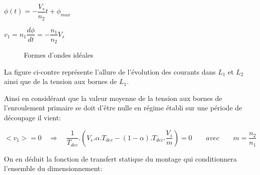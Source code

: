 \documentclass[12pt]{article}
\begin{document}
\vspace{20pt}
$\phi (t) = -\dfrac{V_s}{n_2}t + \phi_{max}$\par
\vspace{10pt}
$v_1 = n_1 \dfrac{d\phi}{dt} = -\dfrac{n_1}{n_2} V_s$ \par



\begin{figure}
  \vspace{-90pt}
  \hspace{-0pt}
  \begin{center}
  \end{center}
  \vspace{-5pt}
  \caption{Formes d'ondes idéales}
  \vspace{-10pt}
\end{figure}
\vspace{120pt}  
La figure ci-contre représente l'allure de l'évolution des courants dans $L_1$ et $L_2$ ainsi que de la tension aux bornes de $L_1$.  


\newpage
Ainsi en considérant que la valeur moyenne de la tension aux bornes de l'enroulement primaire se doit d'être nulle en régime établi sur une période de découpage il vient:\par
\vspace{10pt}

\[<v_1> = 0 \quad \Rightarrow \quad \dfrac{1}{T_{dec}}.(V_e .\alpha .T_{dec} - (1-\alpha) .T_{dec}.\dfrac{V_s}{m}) = 0 \quad \quad avec \quad \quad m = \dfrac{n_2}{n_1}\]


On en déduit la fonction de transfert statique du montage qui conditionnera l'ensemble du dimensionnement:\par
\vspace{10pt}

\begin{center}
\end{center}
\end{document}
